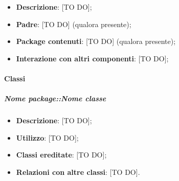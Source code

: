 	\begin{itemize}
		\item \textbf{Descrizione}: [TO DO];
		\item \textbf{Padre}: [TO DO] (qualora presente);
		\item \textbf{Package contenuti}: [TO DO] (qualora presente);
		\item \textbf{Interazione con altri componenti}: [TO DO];
	\end{itemize}

		\paragraph{Classi} %
			\subparagraph{Nome package::Nome classe} %
			\label{subp:subparagraph_name}
				\begin{itemize}
					\item \textbf{Descrizione}: [TO DO];
					\item \textbf{Utilizzo}: [TO DO];
					\item \textbf{Classi ereditate}: [TO DO];
					\item \textbf{Relazioni con altre classi}: [TO DO].
				\end{itemize}



